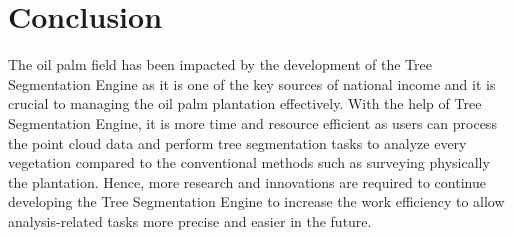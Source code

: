 \documentclass[a4paper, 12pt]{article}
\begin{document}
\section{Conclusion}

The oil palm field has been impacted by the development of the Tree Segmentation Engine as it is one of the key sources of national income and it is crucial to managing the oil palm plantation effectively. With the help of Tree Segmentation Engine, it is more time and resource efficient as users can process the point cloud data and perform tree segmentation tasks to analyze every vegetation compared to the conventional methods such as surveying physically the plantation. Hence, more research and innovations are required to continue developing the Tree Segmentation Engine to increase the work efficiency to allow analysis-related tasks more precise and easier in the future.

\newpage




\nocite{*}
\end{document}
